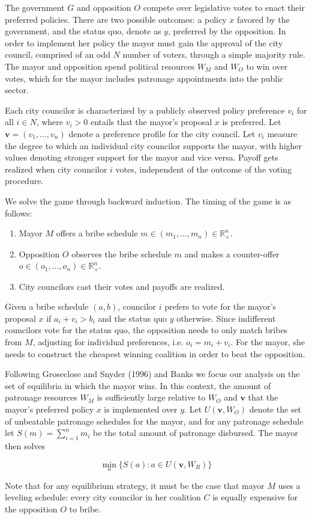 \documentclass[12pt,a4paper]{article}
\newcommand{\real}{\mathbb{R}_+^n}
\newcommand{\bfv}{\mathbf{v}}
\begin{document}
The government $G$ and opposition $O$ compete over legislative votes to enact their preferred policies. There are two possible outcomes: a policy $x$ favored by the government, and the status quo, denote as $y$, preferred by the opposition. In order to implement her policy the mayor must gain the approval of the city council, comprised of an odd $N$ number of voters, through a simple majority rule. The mayor and opposition spend political resources $W_M$ and $W_O$ to win over votes, which for the mayor includes patronage appointments into the public sector.

Each city councilor is characterized by a publicly observed policy preference $v_i$ for all $i \in N$, where $v_i > 0$ entails that the mayor's proposal $x$ is preferred. Let $\mathbf{v} = (v_1, ..., v_n)$ denote a preference profile for the city council. Let $v_i$ measure the degree to which an individual city councilor supports the mayor, with higher values denoting stronger support for the mayor and vice versa. Payoff gets realized when city councilor $i$ votes, independent of the outcome of the voting procedure.

We solve the game through backward induction. The timing of the game is as follows:

\begin{enumerate}
    \item Mayor $M$ offers a bribe schedule $m \in (m_1, ..., m_n) \in \real$.
    \item Opposition $O$ observes the bribe schedule $m$ and makes a counter-offer $o \in (o_1, ..., o_n) \in \real$.
    \item City councilors cast their votes and payoffs are realized.
\end{enumerate}

Given a bribe schedule $(a, b)$, councilor $i$ prefers to vote for the mayor's proposal $x$ if $a_i + v_i > b_i$ and the status quo $y$ otherwise. Since indifferent councilors vote for the status quo, the opposition needs to only match bribes from $M$, adjusting for individual preferences, i.e. $o_i = m_i + v_i$. For the mayor, she needs to construct the cheapest winning coalition in order to beat the opposition. 

Following Groseclose and Snyder (1996) and Banks we focus our analysis on the set of equilibria in which the mayor wins. In this context, the amount of patronage resources $W_M$ is sufficiently large relative to $W_O$ and $\bfv$ that the mayor's preferred policy $x$ is implemented over $y$. Let $U(\bfv, W_O)$ denote the set of unbeatable patronage schedules for the mayor, and for any patronage schedule let $S(m) = \sum_{i = 1}^n m_i$ be the total amount of patronage disbursed. The mayor then solves

\begin{equation}
    \label{eqn:solution}
    \min_a\{S(a) : a \in U(\mathbf{v}, W_B) \}
\end{equation}

Note that for any equilibrium strategy, it must be the case that mayor $M$ uses a leveling schedule: every city councilor in her coalition $C$ is equally expensive for the opposition $O$ to bribe.
\end{document}
